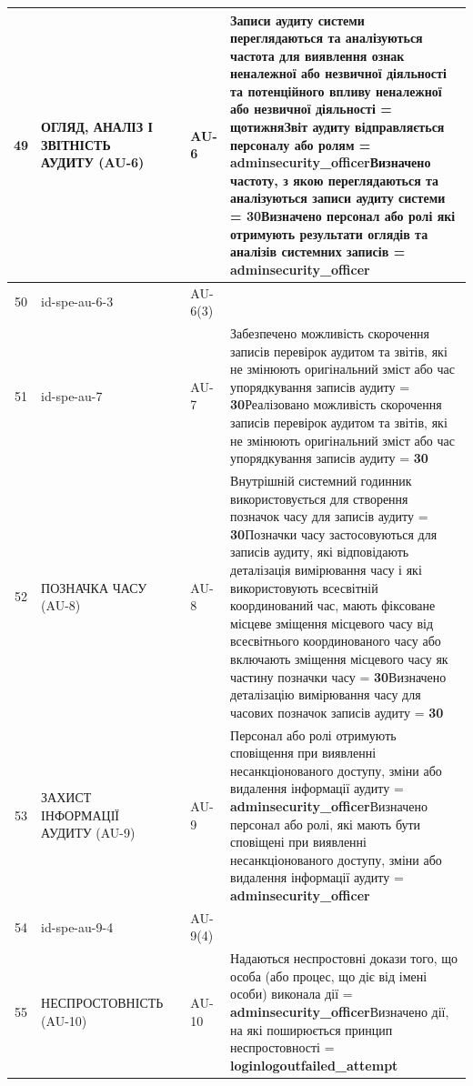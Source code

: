 \documentclass[10pt]{article}
\begin{document}
\begin{longtable}{|c|>{\raggedright\arraybackslash}p{2.5cm}|>{\raggedright\arraybackslash}p{4.5cm}|>{\raggedright\arraybackslash}p{3cm}|>{\raggedright\arraybackslash}p{4.5cm}|}
49 & ОГЛЯД, АНАЛІЗ І ЗВІТНІСТЬ АУДИТУ (AU-6) &  & AU-6 & Записи аудиту системи переглядаються та аналізуються частота для виявлення ознак неналежної або незвичної діяльності та потенційного впливу неналежної або незвичної діяльності = \textbf{щотижня}\newline Звіт аудиту відправляється персоналу або ролям = \textbf{adminsecurity\_\allowbreak{}officer}\newline Визначено частоту, з якою переглядаються та аналізуються записи аудиту системи = \textbf{30}\newline Визначено персонал або ролі які отримують результати оглядів та аналізів системних записів = \textbf{adminsecurity\_\allowbreak{}officer} \\ \hline
50 & id-spe-au-6-3 &  & AU-6(3) &  \\ \hline
51 & id-spe-au-7 &  & AU-7 & Забезпечено можливість скорочення записів перевірок аудитом та звітів, які не змінюють оригінальний зміст або час упорядкування записів аудиту = \textbf{30}\newline Реалізовано можливість скорочення записів перевірок аудитом та звітів, які не змінюють оригінальний зміст або час упорядкування записів аудиту = \textbf{30} \\ \hline
52 & ПОЗНАЧКА ЧАСУ (AU-8) &  & AU-8 & Внутрішній системний годинник використовується для створення позначок часу для записів аудиту = \textbf{30}\newline Позначки часу застосовуються для записів аудиту, які відповідають деталізація вимірювання часу і які використовують всесвітній координований час, мають фіксоване місцеве зміщення місцевого часу від всесвітнього координованого часу або включають зміщення місцевого часу як частину позначки часу = \textbf{30}\newline Визначено деталізацію вимірювання часу для часових позначок записів аудиту = \textbf{30} \\ \hline
53 & ЗАХИСТ ІНФОРМАЦІЇ АУДИТУ (AU-9) &  & AU-9 & Персонал або ролі отримують сповіщення при виявленні несанкціонованого доступу, зміни або видалення інформації аудиту = \textbf{adminsecurity\_\allowbreak{}officer}\newline Визначено персонал або ролі, які мають бути сповіщені при виявленні несанкціонованого доступу, зміни або видалення інформації аудиту = \textbf{adminsecurity\_\allowbreak{}officer} \\ \hline
54 & id-spe-au-9-4 &  & AU-9(4) &  \\ \hline
55 & НЕСПРОСТОВНІСТЬ (AU-10) &  & AU-10 & Надаються неспростовні докази того, що особа (або процес, що діє від імені особи) виконала дії = \textbf{adminsecurity\_\allowbreak{}officer}\newline Визначено дії, на які поширюється принцип неспростовності = \textbf{loginlogoutfailed\_\allowbreak{}attempt} \\ \hline

\end{longtable}
\end{document}
